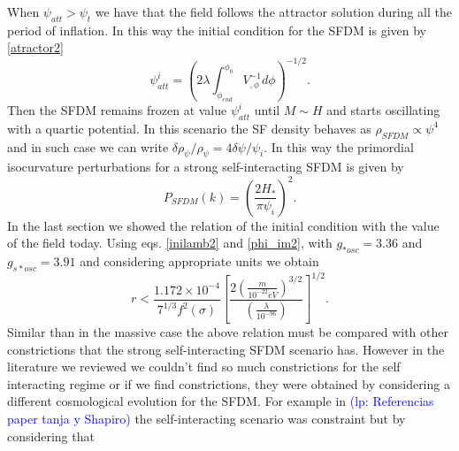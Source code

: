 \documentclass[amssymb,twocolumn,prd,nofootinbib,showpacs]{revtex4-1}
\newcommand{\lp}[1]{\textcolor{blue}{(lp: #1)}}
\begin{document}
When $\psi_{att}>\psi_t$ we have that the field follows the attractor solution during all the period of inflation. 
In this way the initial condition for the SFDM is given by \eqref{atractor2}
%
\begin{equation}\label{atractor3}
\psi_{att}^i = \left(2\lambda\int_{\phi_{end}}^{\phi_0}V^{-1}_{,\phi}d\phi\right)^{-1/2}.
\end{equation}
%
Then the SFDM remains frozen at value $\psi_{att}^i$ until $M\sim H$ and starts oscillating with a 
quartic potential. In this scenario the SF density behaves as $\rho_{SFDM}\propto \psi^4$ and 
in such case we can write $\delta\rho_{\psi}/\rho_\psi=4\delta\psi/\psi_i$. In this way the primordial 
isocurvature perturbations for a strong self-interacting SFDM is given by
%
\begin{equation}
P_{SFDM}(k)=\left(\frac{2H_*}{\pi\psi_i}\right)^2.
\end{equation}
%
In the last section we showed the relation of the initial condition  with the value of the 
field today. Using eqs. \eqref{inilamb2} and \eqref{phi_im2}, 
with $g_{*osc}=3.36$ and $g_{s*osc}=3.91$  and considering appropriate units we obtain
%
\begin{equation}\label{constr4}
r<\frac{1.172\times 10^{-4}}{7^{1/3}f^2(\sigma)}\left[\frac{2
\left(\frac{m}{10^{-22}eV}\right)^{3/2}}{\left(\frac{\lambda}{10^{-96}}\right)}\right]^{1/2}.
\end{equation}
%
Similar than in the massive case the above relation must be compared with other constrictions that the strong self-interacting SFDM scenario has. However in the literature we reviewed we couldn't find so much constrictions for the self interacting regime or if we find constrictions, they were obtained by considering a different cosmological evolution for the SFDM. For example in \lp{Referencias paper tanja y Shapiro} the self-interacting scenario was constraint but by considering that 
\end{document}
